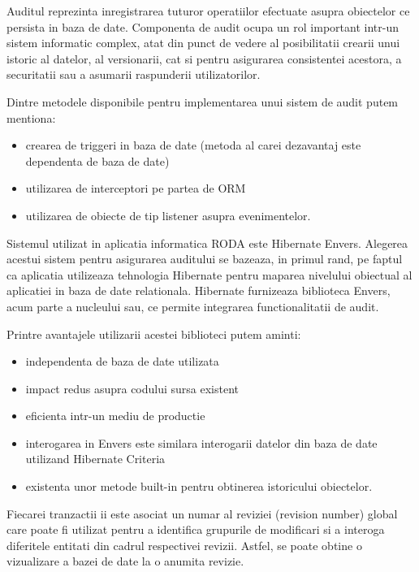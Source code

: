 Auditul reprezinta inregistrarea tuturor operatiilor efectuate asupra obiectelor ce persista in baza de date. Componenta de audit ocupa un rol important intr-un sistem informatic complex, atat din punct de vedere al posibilitatii crearii unui istoric al datelor, al versionarii, cat si pentru asigurarea consistentei acestora, a securitatii sau a asumarii raspunderii utilizatorilor.

\bigskip

Dintre metodele disponibile pentru implementarea unui sistem de audit putem mentiona:

\begin{itemize}
\item crearea de triggeri in baza de date (metoda al carei dezavantaj este dependenta de baza de date)
\item utilizarea de interceptori pe partea de ORM
\item utilizarea de obiecte de tip listener asupra evenimentelor.
\end{itemize}

\bigskip

Sistemul utilizat in aplicatia informatica RODA este Hibernate Envers. Alegerea acestui sistem pentru asigurarea auditului se bazeaza, in primul rand, pe faptul ca aplicatia utilizeaza tehnologia Hibernate pentru maparea nivelului obiectual al aplicatiei in baza de date relationala. Hibernate furnizeaza biblioteca Envers, acum parte a nucleului sau, ce permite integrarea functionalitatii de audit. \ 


\bigskip

Printre avantajele utilizarii acestei biblioteci putem aminti:

\begin{itemize}
\item independenta de baza de date utilizata
\item impact redus asupra codului sursa existent
\item eficienta intr-un mediu de productie
\item interogarea in Envers este similara interogarii datelor din baza de date utilizand Hibernate Criteria
\item existenta unor metode built-in pentru obtinerea istoricului obiectelor.
\end{itemize}

\bigskip

Fiecarei tranzactii ii este asociat un numar al reviziei (revision number) global care poate fi utilizat pentru a identifica grupurile de modificari si a interoga diferitele entitati din cadrul respectivei revizii. Astfel, se poate obtine o vizualizare a bazei de date la o anumita revizie. \ 


